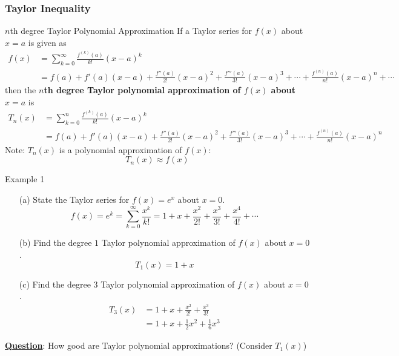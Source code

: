 \documentclass[12pt,a4paper]{article}
\begin{document}
\subsubsection{Taylor Inequality}
\begin{df}{$n$th degree Taylor Polynomial Approximation}
	If a Taylor series for $f(x)$ about $x=a$ is given as
	$$\begin{aligned}
		f(x)&=\sum^\infty_{k=0}\frac{f^{(k)}(a)}{k!}(x-a)^k\\
		&=f(a)+f'(a)(x-a)+\frac{f''(a)}{2!}(x-a)^2+\frac{f'''(a)}{3!}(x-a)^3+\cdots+\frac{f^{(n)}(a)}{n!}(x-a)^n+\cdots
	\end{aligned}$$
	then the \textbf{$n$th degree Taylor polynomial approximation of $f(x)$ about $x=a$} is 
	$$\begin{aligned}
		T_n(x)&=\sum^{n}_{k=0}\frac{f^{(k)}(a)}{k!}(x-a)^k\\
		&=f(a)+f'(a)(x-a)+\frac{f''(a)}{2!}(x-a)^2+\frac{f'''(a)}{3!}(x-a)^3+\cdots+\frac{f^{(n)}(a)}{n!}(x-a)^n
	\end{aligned}$$
	Note: $T_n(x)$ is a polynomial approximation of $f(x)$:
	$$T_n(x)\approx f(x)$$
\end{df}
\begin{eg}{Example 1}
	\begin{enumerate}
		\item[(a)] State the Taylor series for $f(x)=e^x$ about $x=0$.
		$$f(x)=e^{k}=\sum^\infty_{k=0}\frac{x^k}{k!}=1+x+\frac{x^2}{2!}+\frac{x^3}{3!}+\frac{x^4}{4!}+\cdots$$
		\item[(b)] Find the degree $1$ Taylor polynomial approximation of $f(x)$ about $x=0$.
		$$T_1(x)=1+x$$
		\item[(c)] Find the degree $3$ Taylor polynomial approximation of $f(x)$ about $x=0$. 
		$$\begin{aligned}
			T_3(x)&=1+x+\frac{x^2}{2!}+\frac{x^3}{3!}\\
			&=1+x+\frac{1}{2}x^2+\frac{1}{6}x^3
		\end{aligned}$$
	\end{enumerate}	
\end{eg}
\underline{\textbf{Question}}: How good are Taylor polynomial approximations? (Consider $T_1(x)$)
\end{document}
